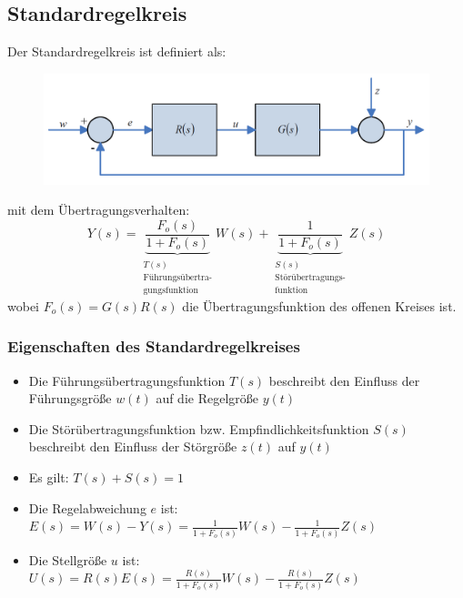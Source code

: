 \documentclass[10pt,a4paper]{article}
\begin{document}
\subsection{Standardregelkreis}

Der Standardregelkreis ist definiert als:
\begin{figure}[H]
	\includegraphics[width = \columnwidth]{imgs/standardregelkreis_2.png}
\end{figure}
mit dem Übertragungsverhalten:
$$
	Y(s) =\underbrace{ \frac{F_o(s)}{1 + F_o(s)}}_{\substack{T(s) \\ \text{Führungsübertra-} \\ \text{gungsfunktion}}} W(s) + \underbrace{\frac{1}{1 + F_o(s)}}_{\substack{S(s) \\ \text{Störübertragungs-} \\ \text{funktion}}} Z(s)
$$
wobei $F_o(s) = G(s)R(s)$ die Übertragungsfunktion des offenen Kreises ist.

\subsubsection{Eigenschaften des Standardregelkreises}
\begin{itemize}
	\item Die Führungsübertragungsfunktion $T(s)$ beschreibt den Einfluss der Führungsgröße $w(t)$ auf die Regelgröße $y(t)$
	\item Die Störübertragungsfunktion bzw. Empfindlichkeitsfunktion $S(s)$ beschreibt den Einfluss der Störgröße $z(t)$ auf $y(t)$
	\item Es gilt: $T(s) + S(s) = 1$
	\item Die Regelabweichung $e$ ist: $E(s) = W(s) - Y(s) = \frac{1}{1 + F_o(s)}W(s) - \frac{1}{1 + F_o(s)} Z(s)$
	\item Die Stellgröße $u$ ist: $U(s) = R(s)E(s) = \frac{R(s)}{1 + F_o(s)}W(s) - \frac{R(s)}{1 + F_o(s)} Z(s)$
\end{itemize}
\end{document}
